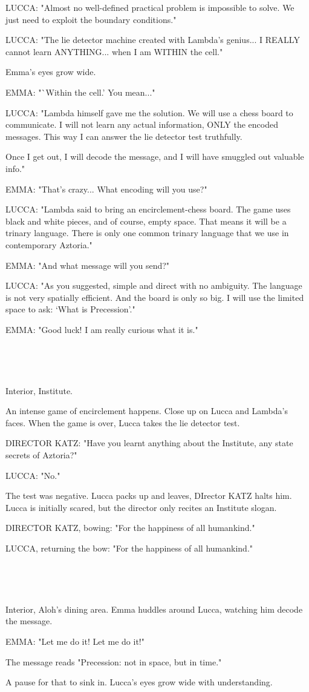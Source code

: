 \documentclass[11pt]{article}
\begin{document}
LUCCA: "Almost no well-defined practical problem is impossible to solve.
We just need to exploit the boundary conditions."

LUCCA: "The lie detector machine created with Lambda's genius... 
I REALLY cannot learn ANYTHING... when I am WITHIN the cell."

Emma's eyes grow wide.

EMMA: "`Within the cell.' You mean..."

LUCCA: "Lambda himself gave me the solution.
We will use a chess board to communicate.
I will not learn any actual information, ONLY the encoded messages.
This way I can answer the lie detector test truthfully.

Once I get out, I will decode the message, and I will have smuggled out valuable info."

EMMA: "That's crazy...
What encoding will you use?"

LUCCA: "Lambda said to bring an encirclement-chess board.
The game uses black and white pieces, and of course, empty space.
That means it will be a trinary language.
There is only one common trinary language that we use in contemporary Aztoria."

EMMA: "And what message will you send?"

LUCCA: "As you suggested, simple and direct with no ambiguity.
The language is not very spatially efficient.
And the board is only so big.
I will use the limited space to ask:
`What is Precession'."

EMMA: "Good luck! I am really curious what it is."

\ 

\ 

Interior, Institute. 

An intense game of encirclement happens.
Close up on Lucca and Lambda's faces.
When the game is over, Lucca takes the lie detector test.

DIRECTOR KATZ: "Have you learnt anything about the Institute, any state secrets of Aztoria?"

LUCCA: "No."

The test was negative.
Lucca packs up and leaves, DIrector KATZ halts him.
Lucca is initially scared, but the director only recites an Institute slogan.

DIRECTOR KATZ, bowing: "For the happiness of all humankind."

LUCCA, returning the bow: "For the happiness of all humankind."

\ 

\ 

Interior, Aloh's dining area. 
Emma huddles around Lucca, watching him decode the message.

EMMA: "Let me do it! Let me do it!"

The message reads "Precession: not in space, but in time."

A pause for that to sink in.
Lucca's eyes grow wide with understanding.
\end{document}
